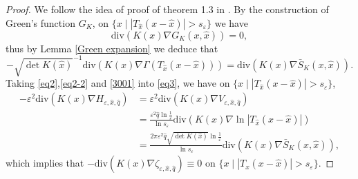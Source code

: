 \documentclass[12pt,reqno]{amsart}
\numberwithin{equation}{section}
\theoremstyle{definition}
\theoremstyle{remark}
\begin{document}
\begin{proof}
We follow the idea of proof of theorem 1.3 in \cite{CW1}. By the construction of Green's function $ G_K $,  on $ \{x\mid |T_{\hat{x}}(x-\hat{x})|>s_\varepsilon\}$ we have
	\begin{equation}\label{3000}
	\text{div}(K(x)\nabla G_K(x,\hat{x}))=0 ,
	\end{equation}
thus by Lemma \ref{Green expansion} we deduce that
	\begin{equation}\label{3001}
	-\sqrt{\det K(\hat{x})}^{-1}\text{div}(K(x)\nabla\Gamma\left (T_{\hat{x}}(x-\hat{x})\right ))=\text{div}(K(x)\nabla\bar{S}_K(x,\hat{x})).
	\end{equation}
Taking \eqref{eq2},\eqref{eq2-2} and \eqref{3001} into \eqref{eq3}, we have on $ \{x\mid |T_{\hat{x}}(x-\hat{x})|>s_\varepsilon\} $,
	\begin{equation*}
	\begin{split}
	-\varepsilon^2\text{div}\left (K(x)\nabla H_{\varepsilon, \hat{x}, \hat{q}}\right )&=\varepsilon^2\text{div}(K(x)\nabla V_{\varepsilon, \hat{x}, \hat{q}})\\
	&=\frac{\varepsilon^2\hat{q}\ln\frac{1}{\varepsilon}}{\ln s_{\varepsilon}}\text{div}(K(x)\nabla \ln|T_{\hat{x}}(x-\hat{x})|)\\
	&=\frac{2\pi\varepsilon^2\hat{q}\sqrt{\det K(\hat{x})}\ln\frac{1}{\varepsilon}}{\ln s_{\varepsilon}}\text{div}(K(x)\nabla \bar{S}_K(x,\hat{x})),
	\end{split}
	\end{equation*}
	which implies that $ -\text{div}(K(x)\nabla \zeta_{\varepsilon, \hat{x}, \hat{q}})\equiv 0 $ on $ \{x\mid |T_{\hat{x}}(x-\hat{x})|>s_\varepsilon\} $.
	

\end{proof}
\end{document}
